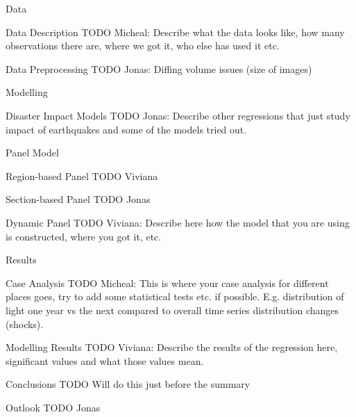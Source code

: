 \documentclass[12pt,fleqn,leqno,letterpaper]{article}
\begin{document}
\begin{section}{Data}
  \begin{subsection}{Data Description}
    TODO Micheal: Describe what the data looks like, how many observations there are, where we got it, who else has used it etc.
  \end{subsection}
  \begin{subsection}{Data Preprocessing}
    TODO Jonas: Diffing volume issues (size of images)
  \end{subsection}
\end{section}

\begin{section}{Modelling}
  \begin{subsection}{Disaster Impact Models}
    TODO Jonas: Describe other regressions that just study impact of earthquakes and some of the models tried out.
  \end{subsection}
  \begin{subsection}{Panel Model}
    \begin{subsubsection}{Region-based Panel}
      TODO Viviana
    \end{subsubsection}
    \begin{subsubsection}{Section-based Panel}
      TODO Jonas
    \end{subsubsection}
    \begin{subsubsection}{Dynamic Panel}
      TODO Viviana: Describe here how the model that you are using is constructed, where you got it, etc.
    \end{subsubsection}
  \end{subsection}
\end{section}

\begin{section}{Results}
  \begin{subsection}{Case Analysis}
    TODO Micheal: This is where your case analysis for different places goes, try to add some statistical tests etc. if possible. E.g. distribution of light one year vs the next compared to overall time series distribution changes (shocks).
  \end{subsection}
  \begin{subsection}{Modelling Results}
    TODO Viviana: Describe the results of the regression here, significant values and what those values mean.
  \end{subsection}
  \begin{subsection}{Conclusions}
    TODO Will do this just before the summary
  \end{subsection}
  \begin{subsection}{Outlook}
    TODO Jonas
  \end{subsection}
\end{section}


\end{document}

